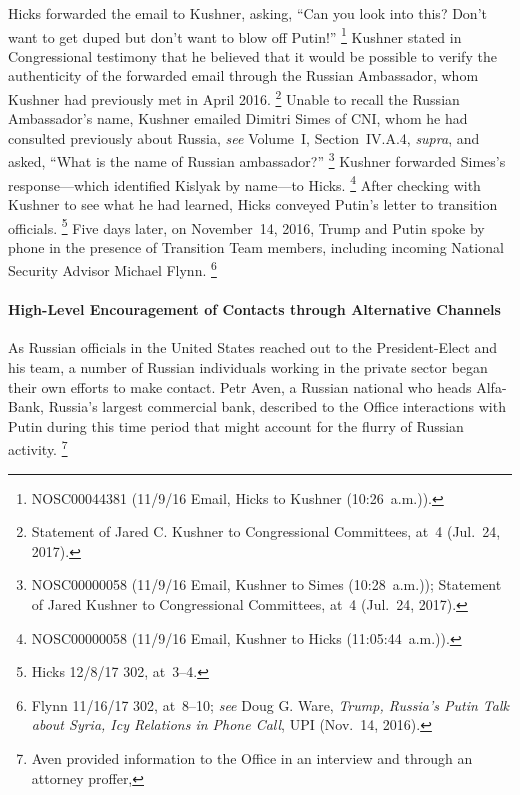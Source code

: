 Hicks forwarded the email to Kushner, asking, ``Can you look into this?
Don't want to get duped but don't want to blow off Putin!''%
\footnote{NOSC00044381 (11/9/16 Email, Hicks to Kushner (10:26~a.m.)).}
Kushner stated in Congressional testimony that he believed that it would be possible to verify the authenticity of the forwarded email through the Russian Ambassador, whom Kushner had previously met in April 2016.%
\footnote{Statement of Jared C. Kushner to Congressional Committees, at~4 (Jul.~24, 2017).}
Unable to recall the Russian Ambassador's name, Kushner emailed Dimitri Simes of CNI, whom he had consulted previously about Russia, \textit{see} Volume~I, Section~IV.A.4, \textit{supra}, and asked, ``What is the name of Russian ambassador?''%
\footnote{NOSC00000058 (11/9/16 Email, Kushner to Simes (10:28~a.m.));
Statement of Jared Kushner to Congressional Committees, at~4 (Jul.~24, 2017).}
Kushner forwarded Simes's response---which identified Kislyak by name---to Hicks.%
\footnote{NOSC00000058 (11/9/16 Email, Kushner to Hicks (11:05:44~a.m.)).}
After checking with Kushner to see what he had learned, Hicks conveyed Putin's letter to transition officials.%
\footnote{Hicks 12/8/17 302, at~3--4.}
Five days later, on November~14, 2016, Trump and Putin spoke by phone in the presence of Transition Team members, including incoming National Security Advisor Michael Flynn.%
\footnote{Flynn 11/16/17 302, at~8--10;
\textit{see} Doug G. Ware, \textit{Trump, Russia's Putin Talk about Syria, Icy Relations in Phone Call}, UPI (Nov.~14, 2016).}

\paragraph{High-Level Encouragement of Contacts through Alternative Channels}

As Russian officials in the United States reached out to the President-Elect and his team, a number of Russian individuals working in the private sector began their own efforts to make contact.
Petr Aven, a Russian national who heads Alfa-Bank, Russia's largest commercial bank, described to the Office interactions with Putin during this time period that might account for the flurry of Russian activity.%
\footnote{Aven provided information to the Office in an interview and through an attorney proffer, }

